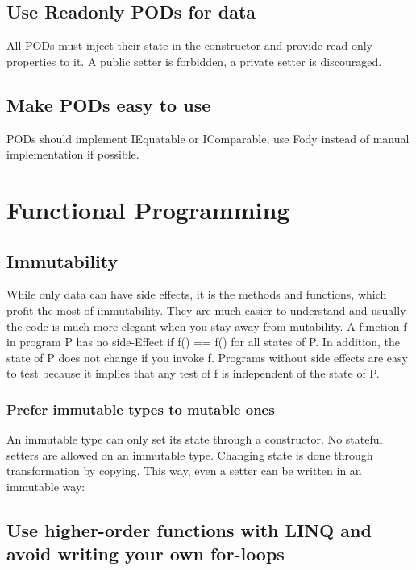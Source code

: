 \documentclass[11pt,a4paper]{article}
\begin{document}
\subsection{Use Readonly PODs for data}

All PODs must inject their state in the constructor and provide read only properties to it.
A public setter is forbidden, a private setter is discouraged. 

\subsection{Make PODs easy to use}

PODs should implement IEquatable or IComparable, use Fody instead of manual implementation if possible.

\section{Functional Programming}

\subsection{Immutability}

While only data can have side effects, it is the methods and functions, which profit the most of immutability. They are much easier to understand and usually the code is much more elegant when you stay away from mutability. A function f in program P has no side-Effect if f() == f() for all states of P. In addition, the state of P does not change if you invoke f.
Programs without side effects are easy to test because it implies that any test of f is independent of the state of P.

\subsubsection{Prefer immutable types to mutable ones}

An immutable type can only set its state through a constructor. No stateful setters are allowed on an immutable type. Changing state is done through transformation by copying. This way, even a setter can be written in an immutable way:


\subsection{Use higher-order functions with LINQ and avoid writing your own for-loops}
\end{document}
